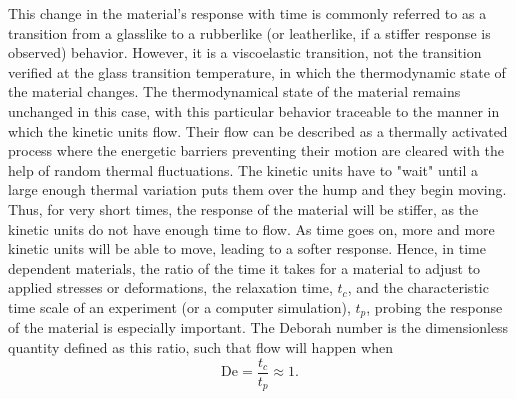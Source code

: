 This change in the material's response with time is commonly referred to as a transition from a glasslike to a rubberlike (or leatherlike, if a stiffer response is observed) behavior.
However, it is a viscoelastic transition, not the transition verified at the glass transition temperature, in which the thermodynamic state of the material changes.
The thermodynamical state of the material remains unchanged in this case, with this particular behavior traceable to the manner in which the kinetic units flow.
Their flow can be described as a thermally activated process where the energetic barriers preventing their motion are cleared with the help of random thermal fluctuations.
The kinetic units have to "wait" until a large enough thermal variation puts them over the hump and they begin moving.
Thus, for very short times, the response of the material will be stiffer, as the kinetic units do not have enough time to flow.
As time goes on, more and more kinetic units will be able to move, leading to a softer response.
Hence, in time dependent materials, the ratio of the time it takes for a material to adjust to applied stresses or deformations, the relaxation time, $t_c$, and the characteristic time scale of an experiment (or a computer simulation), $t_p$, probing the response of the material is especially important.
The Deborah number is the dimensionless quantity defined as this ratio, such that flow will happen when \citep{wardIntroductionMechanicalProperties2004, arzhakovRelaxationPhysicalMechanical2019}
\begin{equation}
    \mathrm{De}=\frac{t_c}{t_p}\approx 1.
\end{equation}

